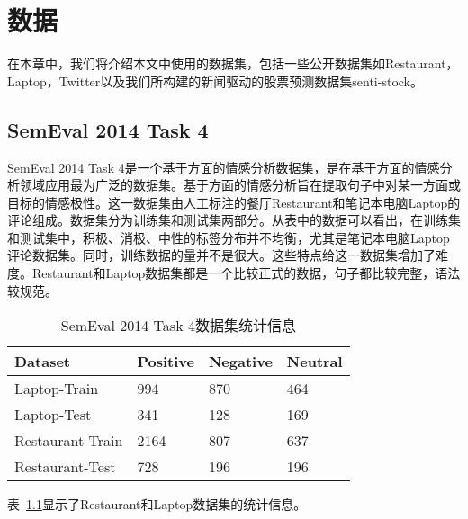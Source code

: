 \chapter{数据}
\label{cha:data}
在本章中，我们将介绍本文中使用的数据集，包括一些公开数据集如Restaurant，Laptop，Twitter以及我们所构建的新闻驱动的股票预测数据集senti-stock。
\section{SemEval 2014 Task 4}
SemEval 2014 Task 4是一个基于方面的情感分析数据集，是在基于方面的情感分析领域应用最为广泛的数据集。基于方面的情感分析旨在提取句子中对某一方面或目标的情感极性。这一数据集由人工标注的餐厅Restaurant和笔记本电脑Laptop的评论组成。数据集分为训练集和测试集两部分。从表中的数据可以看出，在训练集和测试集中，积极、消极、中性的标签分布并不均衡，尤其是笔记本电脑Laptop评论数据集。同时，训练数据的量并不是很大。这些特点给这一数据集增加了难度。Restaurant和Laptop数据集都是一个比较正式的数据，句子都比较完整，语法较规范。

\begin{table}[ht]
	\centering
	\caption{SemEval 2014 Task 4数据集统计信息}
	\label{tab:stat}
	\begin{tabular}{|l|l|l|l|}
	\hline
	Dataset & Positive & Negative & Neutral\\
	\hline
	Laptop-Train &  994 & 870 & 464\\
	Laptop-Test & 341 & 128 & 169\\
	Restaurant-Train & 2164 & 807 & 637\\
	Restaurant-Test & 728 & 196 & 196\\
	\hline
	\end{tabular}
\end{table}
表~\ref{tab:stat}显示了Restaurant和Laptop数据集的统计信息。
